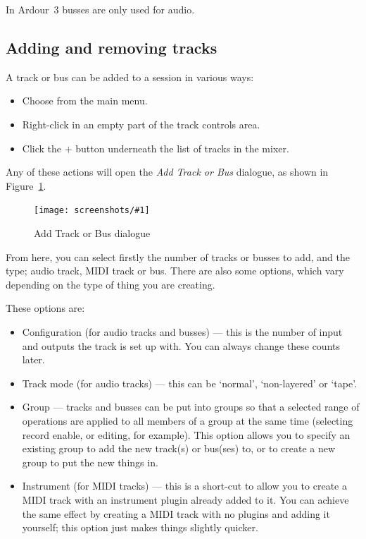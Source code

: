 \documentclass[10pt,a4paper]{book}
\newcommand{\menu}[1]{\emph{\StrSubstitute{#1}{,}{ $\rightarrow$ }}}
\newcommand{\screenshot}[3]{%
\begin{figure}[ht]%
\begin{center}
\texttt{[image: screenshots/\#1]}
\end{center}
\caption{#2}
\label{#3}
\end{figure}}
\begin{document}
In Ardour~3 busses are only used for audio.

\subsection{Adding and removing tracks}

A track or bus can be added to a session in various ways:

\begin{itemize}
\item Choose \menu{Track,Add Track or Bus\ldots} from the main menu.
\item Right-click in an empty part of the track controls area.
\item Click the $+$ button underneath the list of tracks in the mixer.
\end{itemize}

Any of these actions will open the \emph{Add Track or Bus} dialogue,
as shown in Figure~\ref{fig:add-track-or-bus}.

\screenshot{add-track-or-bus.png}{Add Track or Bus dialogue}{fig:add-track-or-bus}

From here, you can select firstly the number of tracks or busses to
add, and the type; audio track, MIDI track or bus.  There are also
some options, which vary depending on the type of thing you are
creating.

These options are:
\begin{itemize}
\item Configuration (for audio tracks and busses) --- this is the
  number of input and outputs the track is set up with.  You can
  always change these counts later.
\item Track mode (for audio tracks) --- this can be `normal', `non-layered' or `tape'.
\item Group --- tracks and busses can be put into groups so that a
  selected range of operations are applied to all members of a group
  at the same time (selecting record enable, or editing, for example).
  This option allows you to specify an existing group to add the new
  track(s) or bus(ses) to, or to create a new group to put the new
  things in.
\item Instrument (for MIDI tracks) --- this is a short-cut to allow you to create a MIDI
  track with an instrument plugin already added to it.  You can
  achieve the same effect by creating a MIDI track with no plugins and
  adding it yourself; this option just makes things slightly quicker.
\end{itemize}
\end{document}
